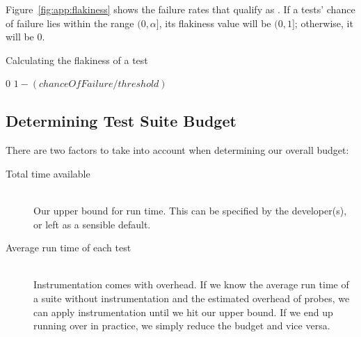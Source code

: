 Figure~\ref{fig:app:flakiness} shows the failure rates that qualify as \flaky{}. If a tests' chance of failure lies within the range $(0, \alpha]$, its flakiness value will be $(0, 1]$; otherwise, it will be $0$.


\algrenewcommand{}
\algrenewcommand{}

\begin{algorithm}[here]\label{alg:app:calculateFlakiness}
\caption{Calculating the flakiness of a test}
\begin{algorithmic}
	\Require{$chanceOfFailure$ and $threshold$ are decimal values within ranges $[0, 1]$ and $(0,1]$ respectively.}
    \Statex


		\State \Return $0$
	\Else
		\State \Return $1 - (chanceOfFailure / threshold)$
	\EndIf

	\EndFunction
\end{algorithmic}
\end{algorithm}


\subsection{Determining Test Suite Budget}

There are two factors to take into account when determining our overall budget:

\begin{description}
	\item[Total time available] \hfill \\
 		Our upper bound for run time. This can be specified by the developer(s), or left as a sensible default.
	\item[Average run time of each test] \hfill \\
		Instrumentation comes with overhead. If we know the average run time of a suite without instrumentation and the estimated overhead of probes, we can apply instrumentation until we hit our upper bound. If we end up running over in practice, we simply reduce the budget and vice versa.
\end{description}

